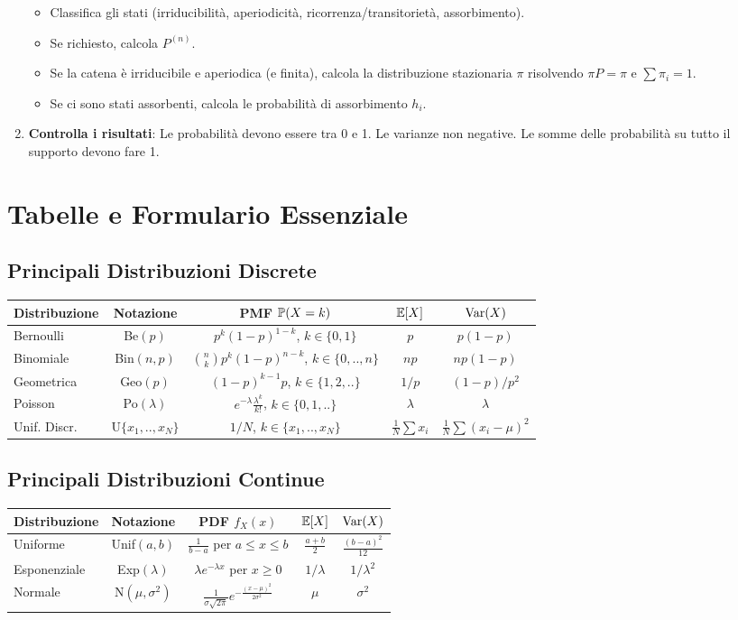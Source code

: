 \documentclass[12pt,a4paper]{article}
\begin{document}
\begin{enumerate}
\begin{itemize}
            \item Classifica gli stati (irriducibilità, aperiodicità, ricorrenza/transitorietà, assorbimento).
            \item Se richiesto, calcola $P^{(n)}$.
            \item Se la catena è irriducibile e aperiodica (e finita), calcola la distribuzione stazionaria $\pi$ risolvendo $\pi P = \pi$ e $\sum \pi_i = 1$.
            \item Se ci sono stati assorbenti, calcola le probabilità di assorbimento $h_i$.
        \end{itemize}
    \item \textbf{Controlla i risultati}: Le probabilità devono essere tra 0 e 1. Le varianze non negative. Le somme delle probabilità su tutto il supporto devono fare 1.
\end{enumerate}

\appendix
\chapter{Tabelle e Formulario Essenziale}
\section{Principali Distribuzioni Discrete}
\begin{tabular}{|l|c|c|c|c|}
\hline
Distribuzione & Notazione & PMF $\mathbb{P}(X=k)$ & $\mathbb{E}[X]$ & $\mathrm{Var}(X)$ \\ \hline
Bernoulli & Be$(p)$ & $p^k(1-p)^{1-k}$, $k \in \{0,1\}$ & $p$ & $p(1-p)$ \\ \hline
Binomiale & Bin$(n,p)$ & $\binom{n}{k}p^k(1-p)^{n-k}$, $k \in \{0,..,n\}$ & $np$ & $np(1-p)$ \\ \hline
Geometrica & Geo$(p)$ & $(1-p)^{k-1}p$, $k \in \{1,2,..\}$ & $1/p$ & $(1-p)/p^2$ \\ \hline
Poisson & Po$(\lambda)$ & $e^{-\lambda}\frac{\lambda^k}{k!}$, $k \in \{0,1,..\}$ & $\lambda$ & $\lambda$ \\ \hline
Unif. Discr. & U$\{x_1,..,x_N\}$ & $1/N$, $k \in \{x_1,..,x_N\}$ & $\frac{1}{N}\sum x_i$ & $\frac{1}{N}\sum (x_i-\mu)^2$ \\ \hline
\end{tabular}

\section{Principali Distribuzioni Continue}
\begin{tabular}{|l|c|c|c|c|}
\hline
Distribuzione & Notazione & PDF $f_X(x)$ & $\mathbb{E}[X]$ & $\mathrm{Var}(X)$ \\ \hline
Uniforme & Unif$(a,b)$ & $\frac{1}{b-a}$ per $a \le x \le b$ & $\frac{a+b}{2}$ & $\frac{(b-a)^2}{12}$ \\ \hline
Esponenziale & Exp$(\lambda)$ & $\lambda e^{-\lambda x}$ per $x \ge 0$ & $1/\lambda$ & $1/\lambda^2$ \\ \hline
Normale & N$(\mu, \sigma^2)$ & $\frac{1}{\sigma\sqrt{2\pi}}e^{-\frac{(x-\mu)^2}{2\sigma^2}}$ & $\mu$ & $\sigma^2$ \\ \hline
\end{tabular}
\end{document}
